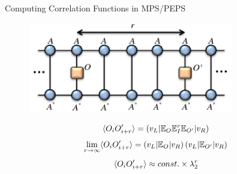 \begin{frame}{Computing Correlation Functions in MPS/PEPS}
\vskip-1.5cm

\begin{figure}[t]
\centering
\includegraphics[width=0.8\textwidth]{diagrams/orus-corrfunc2.png}
%
\end{figure}
\vskip-0.5cm
 $$\langle O_i O'_{i+r} \rangle = \left ( v_L \middle |\mathbb{E}_O \mathbb{E}_I^r \mathbb{E}_{O'} \middle | v_R \right )$$
 $$
 \lim\limits_{r \rightarrow \infty} \langle O_i O'_{i+r} \rangle = \left ( v_L \middle |\mathbb{E}_O \middle | v_R \right ) \left ( v_L \middle |\mathbb{E}_{O'} \middle | v_R \right )
 $$
 $$ \langle O_i O'_{i+r} \rangle \approx const. \times \lambda_2^r $$

\end{frame}